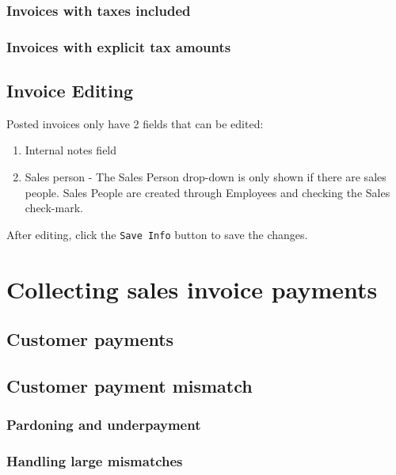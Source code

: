 \subsection{Invoices with taxes included}
\label{subsec-sales-tax-included}

\subsection{Invoices with explicit tax amounts}
\label{subsec-sales-tax-explicit-amount}

\section{Invoice Editing}
\label{sec-invoicing-editing}

Posted invoices only have 2 fields that can be edited:
\begin{enumerate}
\item Internal notes field
\item Sales person - The Sales Person drop-down is only shown if there are sales people. Sales People are created through Employees and checking the Sales check-mark.
\end{enumerate}
After editing, click the  \texttt{Save Info} button to save the changes.

\chapter{Collecting sales invoice payments}
\label{cha-starting-sales-customer-payments}

\section{Customer payments}
\label{sec-starting-sales-customer-payments}

\section{Customer payment mismatch}
\label{sec-starting-sales-payment-mismatch}

\subsection{Pardoning and underpayment}
\label{subsec-sales-payment-mismatch}

\subsection{Handling large mismatches}
\label{subsec-sales-payment-partial}

